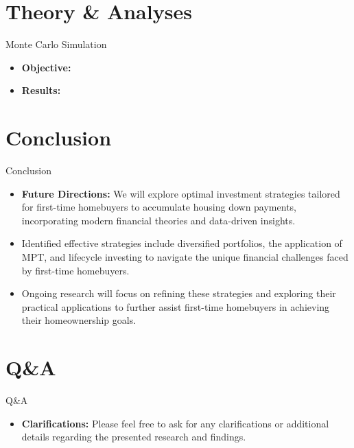 \documentclass{beamer}
\begin{document}
\section{Theory & Analyses}
\begin{frame}{Monte Carlo Simulation}
    \begin{itemize}
        \item \textbf{Objective:} 
        \item \textbf{Results:} 
    \end{itemize}
\end{frame}
















\section{Conclusion}
\begin{frame}{Conclusion}
    \begin{itemize}
        \item \textbf{Future Directions:} We will explore optimal investment strategies tailored for first-time homebuyers to accumulate housing down payments, incorporating modern financial theories and data-driven insights.
        \item Identified effective strategies include diversified portfolios, the application of MPT, and lifecycle investing to navigate the unique financial challenges faced by first-time homebuyers.
        \item Ongoing research will focus on refining these strategies and exploring their practical applications to further assist first-time homebuyers in achieving their homeownership goals.
    \end{itemize}
\end{frame}

\section{Q\&A}
\begin{frame}{Q\&A}
    \begin{itemize}
        \item \textbf{Clarifications:} Please feel free to ask for any clarifications or additional details regarding the presented research and findings.
    \end{itemize}
\end{frame}
\end{document}
